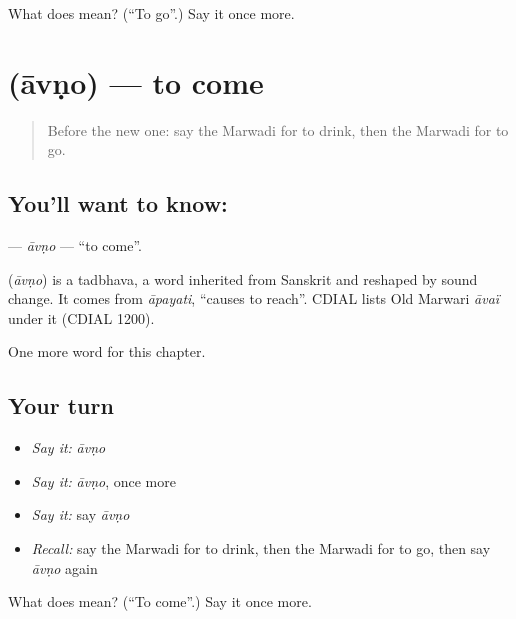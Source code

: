 \begin{tcolorbox}[breakable,colback=teal!4,colframe=teal!35!black,title={Before you move on}]
What does  mean? (\textquotedblleft{}To go\textquotedblright{}.) Say it once more.
\end{tcolorbox}
\section[\texorpdfstring{\mw{आवणो} (āvṇo)}{आवणो (āvṇo)}]{ (āvṇo) — to come}

\label{lesson:MW-C51-avno}



\begin{quote}
Before the new one: say the Marwadi for to drink, then the Marwadi for to go.
\end{quote}

\subsection*{You'll want to know: }
\textbf{} — \emph{āvṇo} — \textquotedblleft{}to come\textquotedblright{}.

\begin{cousinweb}
\textbf{} (\emph{āvṇo}) is a tadbhava, a word inherited from Sanskrit and reshaped by sound change. It comes from \emph{āpayati}, \textquotedblleft{}causes to reach\textquotedblright{}. CDIAL lists Old Marwari \emph{āvaï} under it (CDIAL 1200).
\end{cousinweb}

\begin{grammarlens}[title={What you've built}]
One more word for this chapter.
\end{grammarlens}

\subsection*{Your turn}
\begin{itemize}
\raggedright
  \item \emph{Say it:} \emph{āvṇo}
  \item \emph{Say it:} \emph{āvṇo}, once more
  \item \emph{Say it:} say \emph{āvṇo}
  \item \emph{Recall:} say the Marwadi for to drink, then the Marwadi for to go, then say \emph{āvṇo} again
\end{itemize}

\begin{tcolorbox}[breakable,colback=teal!4,colframe=teal!35!black,title={Before you move on}]
What does  mean? (\textquotedblleft{}To come\textquotedblright{}.) Say it once more.
\end{tcolorbox}
